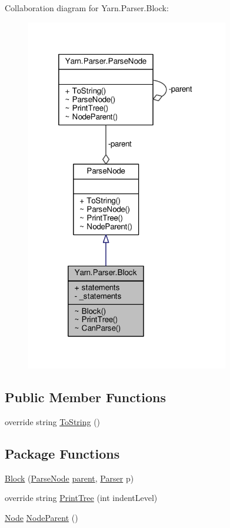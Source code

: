 Collaboration diagram for Yarn.\-Parser.\-Block\-:
\nopagebreak
\begin{figure}[H]
\begin{center}
\leavevmode
\includegraphics[width=251pt]{d9/d8d/a00262}
\end{center}
\end{figure}
\subsection*{Public Member Functions}
\begin{DoxyCompactItemize}
\item 
override string \hyperlink{a00063_a18c67cb16090d0889bb9d6c8c6c565f8}{To\-String} ()
\end{DoxyCompactItemize}
\subsection*{Package Functions}
\begin{DoxyCompactItemize}
\item 
\hyperlink{a00022_a943abeb93be783da7ff6ca595b6a34e7}{Block} (\hyperlink{a00063}{Parse\-Node} \hyperlink{a00063_af313a82103fcc2ff5a177dbb06b92f7b}{parent}, \hyperlink{a00064}{Parser} p)
\item 
override string \hyperlink{a00022_aaaacfc4e3ff2871fa5e2fb75e48636de}{Print\-Tree} (int indent\-Level)
\item 
\hyperlink{a00054}{Node} \hyperlink{a00063_a580e520a29444fc23ac3660cbe514a09}{Node\-Parent} ()
\end{DoxyCompactItemize}
